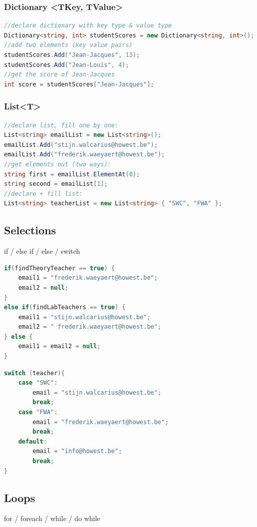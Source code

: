 \documentclass{article}
\begin{document}
\subsubsection{Dictionary <TKey, TValue>}

\begin{lstlisting}[language=csharp]
//declare dictionary with key type & value type
Dictionary<string, int> studentScores = new Dictionary<string, int>();
//add two elements (key value pairs)
studentScores.Add("Jean-Jacques", 13);
studentScores.Add("Jean-Louis", 4);
//get the score of Jean-Jacques
int score = studentScores["Jean-Jacques"];
\end{lstlisting}


\subsubsection{List<T>}

\begin{lstlisting}[language=csharp]
//declare list, fill one by one:
List<string> emailList = new List<string>();
emailList.Add("stijn.walcarius@howest.be");
emailList.Add("frederik.waeyaert@howest.be");
//get elements out (two ways):
string first = emailList.ElementAt(0);
string second = emailList[1];
//declare + fill list:
List<string> teacherList = new List<string> { "SWC", "FWA" };
\end{lstlisting}

\subsection{Selections}
if / else if / else / switch

\begin{lstlisting}[language=csharp]
if(findTheoryTeacher == true) {
    email1 = "frederik.waeyaert@howest.be";
    email2 = null;
}
else if(findLabTeachers == true) {
    email1 = "stijn.walcarius@howest.be";
    email2 = " frederik.waeyaert@howest.be";
} else {
    email1 = email2 = null;
}
\end{lstlisting}

\begin{lstlisting}[language=csharp]
switch (teacher){
    case "SWC":
        email = "stijn.walcarius@howest.be";
        break;
    case "FWA":
        email = "frederik.waeyaert@howest.be";
        break;
    default:
        email = "info@howest.be";
        break;
}
\end{lstlisting}

\subsection{Loops}
for / foreach / while / do while
\end{document}
